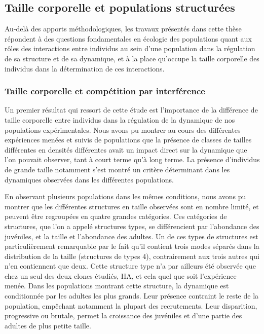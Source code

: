 \subsection{Taille corporelle et populations structurées}

Au-delà des apports méthodologiques, les travaux présentés dans cette thèse
répondent à des questions fondamentales en écologie des populations quant aux
rôles des interactions entre individus au sein d'une population dans la
régulation de sa structure et de sa dynamique, et à la place qu'occupe la taille
corporelle des individus dans la détermination de ces interactions.

\subsubsection{Taille corporelle et compétition par interférence}

Un premier résultat qui ressort de cette étude est l'importance de la différence
de taille corporelle entre individus dans la régulation de la dynamique de nos
populations expérimentales. Nous avons pu montrer au cours des différentes
expériences menées et suivis de populations que la présence de classes de
tailles différentes en densités différentes avait un impact direct sur la
dynamique que l'on pouvait observer, tant à court terme qu'à long terme.
La présence d'individus de grande taille notamment s'est montré un critère
déterminant dans les dynamiques observées dans les différentes populations.

En observant plusieurs populations dans les mêmes conditions, nous avons pu
montrer que les différentes structures en taille observées sont en nombre
limité, et peuvent être regroupées en quatre grandes catégories. Ces catégories
de structures, que l'on a appelé structures types, se différencient par
l'abondance des juvéniles, et la taille et l'abondance des adultes.
Un de ces types de structures est particulièrement remarquable par le fait qu'il
contient trois modes séparés dans la distribution de la taille (structures
de types 4), contrairement aux trois autres qui n'en contiennent que deux. Cette
structure type n'a par ailleurs été observée que chez un seul des deux clones
étudiés, HA, et cela quel que soit l'expérience menée. Dans les populations
montrant cette structure, la dynamique est conditionnée par les adultes les plus
grands. Leur présence contraint le reste de la population, empêchant notamment
la plupart des recrutements. Leur disparition, progressive ou brutale, permet la
croissance des juvéniles et d'une partie des adultes de plus petite taille.

